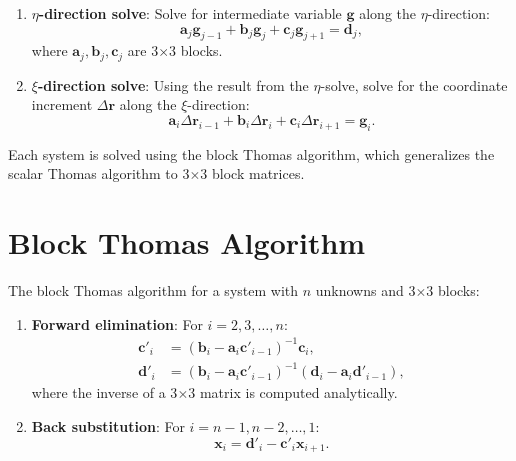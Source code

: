 \documentclass[11pt,a4paper]{report}
\newcommand{\rvec}{\bm{r}}
\begin{document}
\begin{enumerate}
    \item \textbf{$\eta$-direction solve}: Solve for intermediate variable $\bm{g}$ along the $\eta$-direction:
    \begin{equation}
        \bm{a}_j \bm{g}_{j-1} + \bm{b}_j \bm{g}_j + \bm{c}_j \bm{g}_{j+1} = \bm{d}_j,
    \end{equation}
    where $\bm{a}_j, \bm{b}_j, \bm{c}_j$ are 3$\times$3 blocks.

    \item \textbf{$\xi$-direction solve}: Using the result from the $\eta$-solve, solve for the coordinate increment $\Delta \rvec$ along the $\xi$-direction:
    \begin{equation}
        \bm{a}_i \Delta \rvec_{i-1} + \bm{b}_i \Delta \rvec_i + \bm{c}_i \Delta \rvec_{i+1} = \bm{g}_i.
    \end{equation}
\end{enumerate}

Each system is solved using the block Thomas algorithm, which generalizes the scalar Thomas algorithm to 3$\times$3 block matrices.

\section{Block Thomas Algorithm}

The block Thomas algorithm for a system with $n$ unknowns and 3$\times$3 blocks:

\begin{enumerate}
    \item \textbf{Forward elimination}: For $i = 2, 3, \ldots, n$:
    \begin{equation}
    \begin{aligned}
        \bm{c}'_i &= (\bm{b}_i - \bm{a}_i \bm{c}'_{i-1})^{-1} \bm{c}_i, \\
        \bm{d}'_i &= (\bm{b}_i - \bm{a}_i \bm{c}'_{i-1})^{-1} (\bm{d}_i - \bm{a}_i \bm{d}'_{i-1}),
    \end{aligned}
    \end{equation}
    where the inverse of a 3$\times$3 matrix is computed analytically.

    \item \textbf{Back substitution}: For $i = n-1, n-2, \ldots, 1$:
    \begin{equation}
        \bm{x}_i = \bm{d}'_i - \bm{c}'_i \bm{x}_{i+1}.
    \end{equation}
\end{enumerate}
\end{document}
